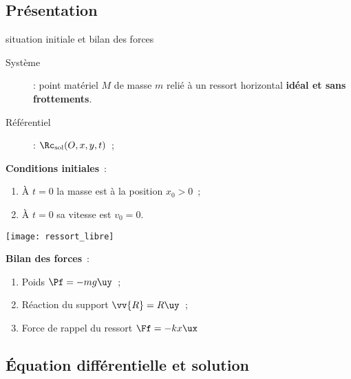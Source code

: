 \documentclass[../main/main.tex]{subfiles}
\begin{document}
\subsection{Présentation}
\begin{defi}[label=def:ressortlibre, sidebyside, righthand ratio=.5]{situation
    initiale et bilan des forces}
    \begin{description}
        \item[Système] : point matériel $M$ de masse $m$ relié à un ressort
            horizontal \textbf{idéal et sans frottements}.
        \item[Référentiel] : $\Rc_{\rm sol} (O,x,y,t)$~;
    \end{description}

    \bigbreak

    \textbf{Conditions initiales}~:
    \begin{enumerate}[leftmargin=20pt]
        \item À $t=0$ la masse est à la position $x_0 > 0$~;
        \item À $t=0$ sa vitesse est $v_0 = 0$.
    \end{enumerate}

    \tcblower
    \begin{center}
        \texttt{[image: ressort\_libre]}
    \end{center}

    \textbf{Bilan des forces}~:
    \begin{enumerate}
        \item Poids $\Pf = -mg\uy$~;
        \item Réaction du support $\vv{R} = R\uy$~;
        \item Force de rappel du ressort $\Ff = -kx\ux$
    \end{enumerate}

\end{defi}

\subsection{Équation différentielle et solution}
\end{document}
